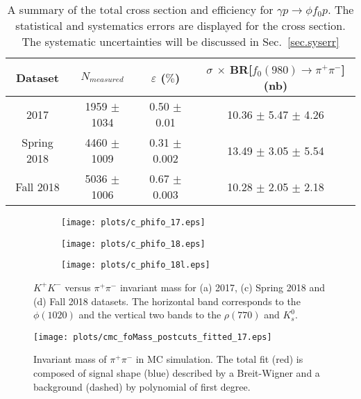 \begin{table*}[!b]
    \centering
    \caption{A summary of the total cross section and efficiency for $\gamma p \rightarrow \phi f_0 p$. The statistical and systematics errors are displayed for the cross section. The systematic uncertainties will be discussed in Sec.~\ref{sec.syserr}}
    \label{tab.xsec_ul.phifo}
    \begin{tabular}{|c|c|c|c|}
        \hline
        Dataset & $N_{measured}$ & $\varepsilon$ ($\%$) & $\sigma$ $\times$ BR[$f_0(980) \rightarrow \pi^{+} \pi^{-}$] (nb) \\
        \hline
        2017 & 1959 $\pm$ 1034 & 0.50 $\pm$ 0.01 & 10.36 $\pm$ 5.47 $\pm$ 4.26 \\
        Spring 2018 & 4460 $\pm$ 1009 & 0.31 $\pm$ 0.002 & 13.49 $\pm$ 3.05 $\pm$ 5.54 \\
        Fall 2018 & 5036 $\pm$ 1006 & 0.67 $\pm$ 0.003 & 10.28 $\pm$ 2.05 $\pm$ 2.18 \\
        \hline
    \end{tabular}
\end{table*}

\begin{figure}[H]
    \centering
    \begin{subfigure}[b]{0.49\textwidth}
        \texttt{[image: plots/c\_phifo\_17.eps]}
        \caption{}
        \label{fig.xsec_ul.phifo.1.a}
    \end{subfigure}
    \begin{subfigure}[b]{0.49\textwidth}
        \texttt{[image: plots/c\_phifo\_18.eps]}
        \caption{}
        \label{fig.xsec_ul.phifo.1.b}
    \end{subfigure}
    \begin{subfigure}[b]{0.49\textwidth}
        \texttt{[image: plots/c\_phifo\_18l.eps]}
        \caption{}
        \label{fig.xsec_ul.phifo.1.c}
    \end{subfigure}
    \caption{$K^{+}K^{-}$ versus $\pi^+ \pi^-$ invariant mass for (a) 2017, (c) Spring 2018 and (d) Fall 2018 datasets. The horizontal band corresponds to the $\phi(1020)$ and the vertical two bands to the $\rho(770)$ and $K_{s}^{0}$.}
    \label{fig.xsec_ul.phifo.1}
\end{figure}

\begin{figure}[H]
    \centering
    \texttt{[image: plots/cmc\_foMass\_postcuts\_fitted\_17.eps]}
    \caption{\label{fig.xsec_ul.phifo.2}Invariant mass of $\pi^+ \pi^-$ in MC simulation. The total fit (red) is composed of signal shape (blue) described by a Breit-Wigner and a background (dashed) by polynomial of first degree.}
\end{figure}

